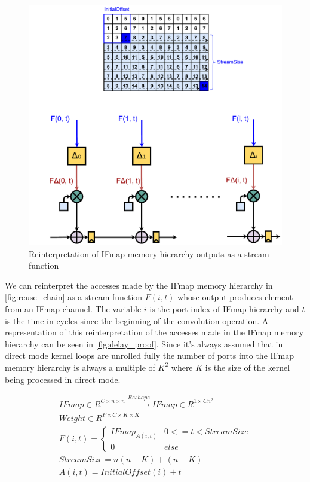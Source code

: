 \begin{figure}[]
    \centering
    \includegraphics[scale=0.5]{fig/delayproof.pdf}
    \caption{Reinterpretation of IFmap memory hierarchy outputs as a stream function}
    \label{fig:delay_proof}
\end{figure}

We can reinterpret the accesses made by the IFmap memory hierarchy in
\autoref{fig:reuse_chain} as a stream function $F(i, t)$ whose output produces
element from an IFmap channel. The variable $i$ is the port index of IFmap
hierarchy and $t$ is the time in cycles since the beginning of the convolution
operation. A representation of this reinterpretation of the accesses made in the
IFmap memory hierarchy can be seen in \autoref{fig:delay_proof}. Since it's
always assumed that in direct mode kernel loops are unrolled fully the number of
ports into the IFmap memory hierarchy is always a multiple of $K^2$ where $K$ is
the size of the kernel being processed in direct mode. 

\begin{gather}
    IFmap \in R^{C\times n \times n} \xrightarrow{Reshape} IFmap \in R^{1\times Cn^2} \\
    Weight \in R^{F\times C\times K \times K} \\
    F(i, t)=    \begin{cases}
                    IFmap_{A(i, t)} & 0<=t < StreamSize \\
                    0 & else
                \end{cases} \\
    StreamSize = n(n-K)+(n-K) \\
    A(i, t) = InitialOffset(i) + t\\
\end{gather}

